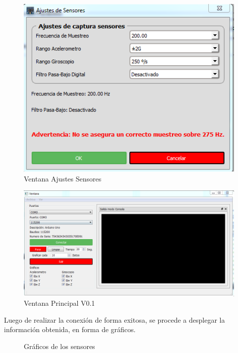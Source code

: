 \documentclass[12pt,a4paper]{article}
\begin{document}
			\begin{figure}[H]
				\centering
				\includegraphics[scale=0.6]{images/ajustesSensores}
				\caption{Ventana Ajustes Sensores}
				\label{fig:ajustessensores}
			\end{figure}
			
			
			\begin{figure}[H]
				\centering
				\includegraphics[scale=0.6]{images/mainwindow}
				\caption{Ventana Principal V0.1}
				\label{fig:mainwindow}
			\end{figure}
			
			Luego de realizar la conexión de forma exitosa, se procede a desplegar la información obtenida, en forma de gráficos.
			
			\begin{figure}[H]
				\centering
				\caption{Gráficos de los sensores}
				\label{fig:Graficosensores}
			\end{figure}
			
\end{document}

